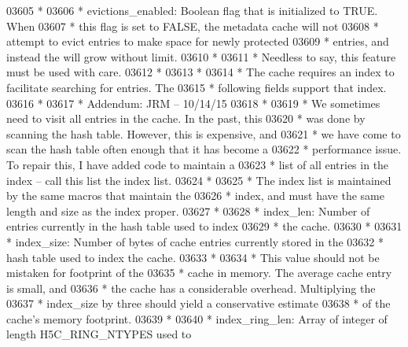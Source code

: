 \begin{DoxyCode}
03605 \textcolor{comment}{ *}
03606 \textcolor{comment}{ * evictions\_enabled:  Boolean flag that is initialized to TRUE.  When}
03607 \textcolor{comment}{ *      this flag is set to FALSE, the metadata cache will not}
03608 \textcolor{comment}{ *      attempt to evict entries to make space for newly protected}
03609 \textcolor{comment}{ *      entries, and instead the will grow without limit.}
03610 \textcolor{comment}{ *      }
03611 \textcolor{comment}{ *      Needless to say, this feature must be used with care.}
03612 \textcolor{comment}{ *}
03613 \textcolor{comment}{ *}
03614 \textcolor{comment}{ * The cache requires an index to facilitate searching for entries.  The}
03615 \textcolor{comment}{ * following fields support that index.}
03616 \textcolor{comment}{ *}
03617 \textcolor{comment}{ * Addendum:  JRM -- 10/14/15}
03618 \textcolor{comment}{ *}
03619 \textcolor{comment}{ * We sometimes need to visit all entries in the cache.  In the past, this}
03620 \textcolor{comment}{ * was done by scanning the hash table.  However, this is expensive, and }
03621 \textcolor{comment}{ * we have come to scan the hash table often enough that it has become a }
03622 \textcolor{comment}{ * performance issue.  To repair this, I have added code to maintain a }
03623 \textcolor{comment}{ * list of all entries in the index -- call this list the index list.  }
03624 \textcolor{comment}{ *}
03625 \textcolor{comment}{ * The index list is maintained by the same macros that maintain the }
03626 \textcolor{comment}{ * index, and must have the same length and size as the index proper.}
03627 \textcolor{comment}{ *}
03628 \textcolor{comment}{ * index\_len:   Number of entries currently in the hash table used to index}
03629 \textcolor{comment}{ *      the cache.}
03630 \textcolor{comment}{ *}
03631 \textcolor{comment}{ * index\_size:  Number of bytes of cache entries currently stored in the}
03632 \textcolor{comment}{ *              hash table used to index the cache.}
03633 \textcolor{comment}{ *}
03634 \textcolor{comment}{ *              This value should not be mistaken for footprint of the}
03635 \textcolor{comment}{ *              cache in memory.  The average cache entry is small, and}
03636 \textcolor{comment}{ *              the cache has a considerable overhead.  Multiplying the}
03637 \textcolor{comment}{ *              index\_size by three should yield a conservative estimate}
03638 \textcolor{comment}{ *              of the cache's memory footprint.}
03639 \textcolor{comment}{ *}
03640 \textcolor{comment}{ * index\_ring\_len: Array of integer of length H5C\_RING\_NTYPES used to }

\end{DoxyCode}
